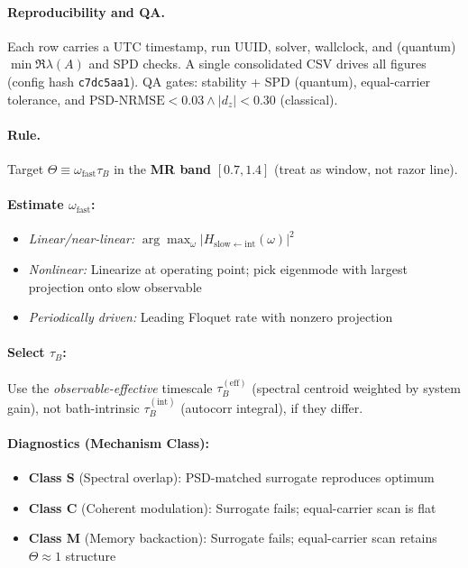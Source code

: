 \documentclass[11pt,letterpaper]{article}
\newcommand{\confighash}{c7dc5aa1}
\DeclareRobustCommand{\GatePSD}{\ensuremath{\text{PSD-NRMSE}<0.03}\xspace}
\DeclareRobustCommand{\GateDZ}{\ensuremath{\lvert d_z\rvert<0.30}\xspace}
\DeclareRobustCommand{\GateEQ}{\ensuremath{\GatePSD \wedge \GateDZ}\xspace}
\begin{document}
\paragraph*{Reproducibility and QA.}
Each row carries a UTC timestamp, run UUID, solver, wallclock, and (quantum) $\min \Re \lambda(A)$ and SPD checks. A single consolidated CSV drives all figures (config hash \texttt{\confighash}). QA gates: stability + SPD (quantum), equal-carrier tolerance, and \GateEQ{} (classical).

\begin{tcolorbox}[colback=blue!5!white,colframe=blue!75!black,title=Design Card: Memory-Resonance Condition ($\Theta \approx 1$)]

\paragraph*{Rule.} Target $\Theta \equiv \omega_{\mathrm{fast}} \tau_B$ in the \textbf{MR band} $[0.7, 1.4]$ (treat as window, not razor line).

\paragraph*{Estimate $\omega_{\mathrm{fast}}$:}
\begin{itemize}[nosep,leftmargin=*]
\item \emph{Linear/near-linear:} $\arg\max_\omega |H_{\mathrm{slow}\leftarrow\mathrm{int}}(\omega)|^2$
\item \emph{Nonlinear:} Linearize at operating point; pick eigenmode with largest projection onto slow observable
\item \emph{Periodically driven:} Leading Floquet rate with nonzero projection
\end{itemize}

\paragraph*{Select $\tau_B$:}
Use the \emph{observable-effective} timescale $\tau_B^{(\mathrm{eff})}$ (spectral centroid weighted by system gain), not bath-intrinsic $\tau_B^{(\mathrm{int})}$ (autocorr integral), if they differ.

\paragraph*{Diagnostics (Mechanism Class):}
\begin{itemize}[nosep,leftmargin=*]
\item \textbf{Class S} (Spectral overlap): PSD-matched surrogate reproduces optimum
\item \textbf{Class C} (Coherent modulation): Surrogate fails; equal-carrier scan is flat
\item \textbf{Class M} (Memory backaction): Surrogate fails; equal-carrier scan retains $\Theta\!\approx\!1$ structure
\end{itemize}


\end{tcolorbox}
\end{document}
